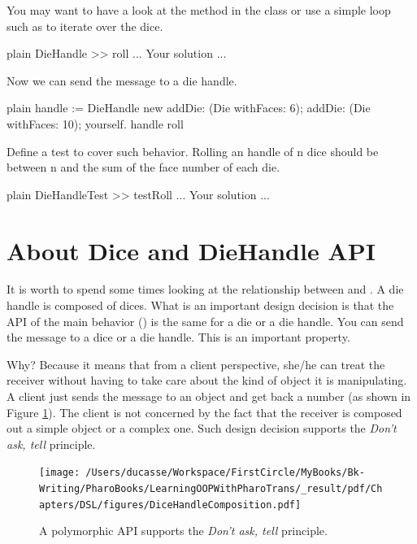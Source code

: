 \documentclass[10pt,twoside,english]{_support/latex/sbabook/sbabook}
\begin{document}
You may want to have a look at the method  in the class  or use a simple loop such as  to iterate over the dice.

\begin{displaycode}{plain}
DieHandle >> roll
	... Your solution ...
\end{displaycode}

Now we can send the message  to a die handle.

\begin{displaycode}{plain}
handle := DieHandle new 
		addDie: (Die withFaces: 6);
		addDie: (Die withFaces: 10);
		yourself.
handle roll
\end{displaycode}

Define a test to cover such behavior. Rolling an handle of n dice should be between n and the sum of the face number of each die. 

\begin{displaycode}{plain}
DieHandleTest >> testRoll
	... Your solution ...
\end{displaycode}
\section{About Dice and DieHandle API}
It is worth to spend some times looking at the relationship between  and . 
A die handle is composed of dices. What is an important design decision is that the API of the main behavior () is the same for a die or a die handle. You can send the message  to a dice or a die handle. This is an important property.

Why? Because it means that from a client perspective, she/he can treat the receiver without having to take care about the kind of object it is manipulating. A client just sends the message  to an object and get back a number (as shown in Figure \ref{figDieHandleComposition}). The client is not concerned by the fact that the receiver is composed out a simple object or a complex one. Such design decision supports the \textit{Don't ask, tell} principle.


\begin{figure}

\begin{center}
\texttt{[image: /Users/ducasse/Workspace/FirstCircle/MyBooks/Bk-Writing/PharoBooks/LearningOOPWithPharoTrans/\_result/pdf/Chapters/DSL/figures/DiceHandleComposition.pdf]}\caption{A polymorphic API supports the \textit{Don't ask, tell} principle.\label{figDieHandleComposition}}\end{center}
\end{figure}
\end{document}
